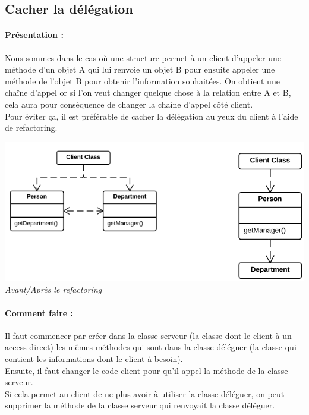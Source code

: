 \documentclass[a4paper,twoside,12pt,openright]{report}
\begin{document}
\subsection{Cacher la délégation}
\paragraph{Présentation :}
Nous sommes dans le cas où une structure permet à un client d'appeler une méthode d'un objet A qui lui renvoie un objet B pour ensuite appeler une méthode de l'objet B pour obtenir l'information souhaitées. On obtient une chaîne d'appel or si l'on veut changer quelque chose à la relation entre A et B, cela aura pour conséquence de changer la chaîne d'appel côté client.\\
Pour éviter ça, il est préférable de cacher la délégation au yeux du client à l'aide de refactoring.

\begin{center}
\includegraphics[scale=0.7]{Image/Cacher_Delegation.png}\\
\itshape{Avant/Après le refactoring \cite{ref5}}
\end{center}

\paragraph{Comment faire :}
Il faut commencer par créer dans la classe serveur (la classe dont le client à un access direct) les mêmes méthodes qui sont dans la classe déléguer (la classe qui contient les informations dont le client à besoin).\\
Ensuite, il faut changer le code client pour qu'il appel la méthode de la classe serveur.\\
Si cela permet au client de ne plus avoir à utiliser la classe déléguer, on peut supprimer la méthode de la classe serveur qui renvoyait la classe déléguer.
\end{document}

